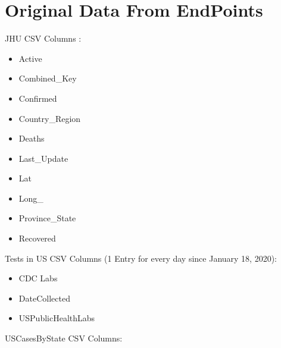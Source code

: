 \documentclass[11pt]{article}
\newcommand{\comment}[1]{{\color{red}{#1}}}
\begin{document}
\section{Original Data From EndPoints}

\noindent
JHU CSV Columns :

\begin{itemize}
    \item Active
    \item Combined\_Key
    \item Confirmed
    \item Country\_Region
    \item Deaths
    \item Last\_Update
    \item Lat
    \item Long\_
    \item Province\_State
    \item Recovered
\end{itemize}

\noindent
Tests in US CSV Columns (1 Entry for every day since January 18, 2020):

\begin{itemize}
    \item CDC Labs
    \item DateCollected
    \item USPublicHealthLabs
\end{itemize}

\noindent
USCasesByState CSV Columns:
\end{document}

